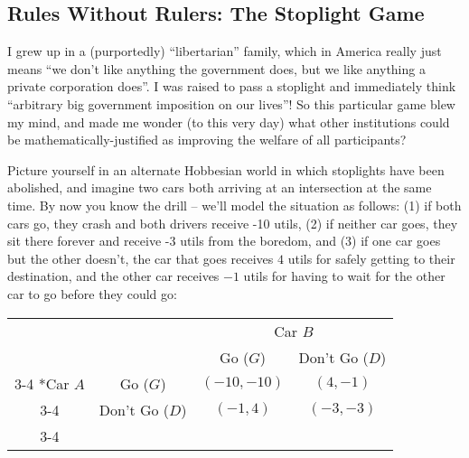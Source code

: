 \subsection{Rules Without Rulers: The Stoplight Game}


I grew up in a (purportedly) ``libertarian'' family, which in America really just means ``we don't like anything the government does, but we like anything a private corporation does''. I was raised to pass a stoplight and immediately think ``arbitrary big government imposition on our lives''! So this particular game blew my mind, and made me wonder (to this very day) what other institutions could be mathematically-justified as improving the welfare of all participants?

Picture yourself in an alternate Hobbesian world in which stoplights have been abolished, and imagine two cars both arriving at an intersection at the same time. By now you know the drill -- we'll model the situation as follows: (1) if both cars go, they crash and both drivers receive -10 utils, (2) if neither car goes, they sit there forever and receive -3 utils from the boredom, and (3) if one car goes but the other doesn't, the car that goes receives $4$ utils for safely getting to their destination, and the other car receives $-1$ utils for having to wait for the other car to go before they could go:
\begin{table}[ht!]
	\centering
	\setlength{\extrarowheight}{2pt}
	\begin{tabular}{cc|c|c|}
		& \multicolumn{1}{c}{} & \multicolumn{2}{c}{Car $B$}\\
		& \multicolumn{1}{c}{} & \multicolumn{1}{c}{Go ($G$)}  & \multicolumn{1}{c}{Don't Go ($D$)} \\\cline{3-4}
		\multirow{2}*{Car $A$}  & Go ($G$) & $(-10,-10)$ & $(4,-1)$ \\\cline{3-4}
		& Don't Go ($D$) & $(-1,4)$ & $(-3,-3)$ \\\cline{3-4}
	\end{tabular}
	\label{fig:stoplight}
\end{table}

